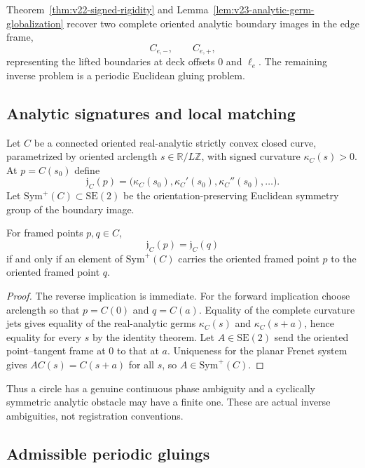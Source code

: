 Theorem~\ref{thm:v22-signed-rigidity} and
Lemma~\ref{lem:v23-analytic-germ-globalization} recover two complete oriented
analytic boundary images in the edge frame,
\[
                         C_{e,-},\qquad C_{e,+},
\]
representing the lifted boundaries at deck offsets \(0\) and \(\ell_e\).
The remaining inverse problem is a periodic Euclidean gluing problem.

\subsection{Analytic signatures and local matching}

Let \(C\) be a connected oriented real-analytic strictly convex closed curve,
parametrized by oriented arclength \(s\in\mathbb R/L\mathbb Z\), with signed
curvature \(\kappa_C(s)>0\).  At \(p=C(s_0)\) define
\[
 \mathfrak j_C(p)=
 \bigl(\kappa_C(s_0),\kappa_C'(s_0),\kappa_C''(s_0),\ldots\bigr).
\]
Let \(\mathrm{Sym}^+(C)\subset\mathrm{SE}(2)\) be the orientation-preserving
Euclidean symmetry group of the boundary image.

\begin{lemma}
\label{lem:v23-signature-symmetry}
For framed points \(p,q\in C\),
\[
                         \mathfrak j_C(p)=\mathfrak j_C(q)
\]
if and only if an element of \(\mathrm{Sym}^+(C)\) carries the oriented framed
point \(p\) to the oriented framed point \(q\).
\end{lemma}

\begin{proof}
The reverse implication is immediate.  For the forward implication choose
arclength so that \(p=C(0)\) and \(q=C(a)\).  Equality of the complete
curvature jets gives equality of the real-analytic germs
\(\kappa_C(s)\) and \(\kappa_C(s+a)\), hence equality for every \(s\) by the
identity theorem.  Let \(A\in\mathrm{SE}(2)\) send the oriented point--tangent
frame at \(0\) to that at \(a\).  Uniqueness for the planar Frenet system gives
\(AC(s)=C(s+a)\) for all \(s\), so \(A\in\mathrm{Sym}^+(C)\).
\end{proof}

Thus a circle has a genuine continuous phase ambiguity and a cyclically
symmetric analytic obstacle may have a finite one.  These are actual inverse
ambiguities, not registration conventions.

\subsection{Admissible periodic gluings}

